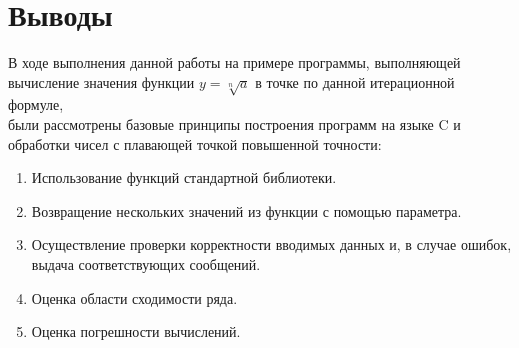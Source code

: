 \section{Выводы}

В ходе выполнения данной работы на примере программы,
выполняющей вычисление значения функции $ y = \sqrt[n]{a} $
в точке по данной итерационной формуле, \\
были рассмотрены базовые принципы построения программ на языке C
и обработки чисел с плавающей точкой повышенной точности:

\begin{enumerate}
  \item Использование функций стандартной библиотеки.
  \item Возвращение нескольких значений из функции с помощью параметра.
  \item Осуществление проверки корректности вводимых данных и, в случае ошибок, \\ выдача соответствующих сообщений.
  \item Оценка области сходимости ряда.
  \item Оценка погрешности вычислений.
\end{enumerate}
